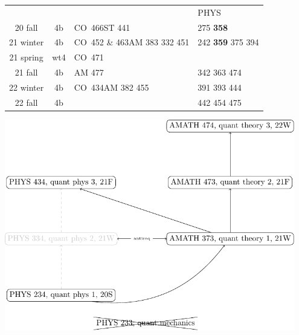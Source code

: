 \documentclass{article}
\newcommand{\co}[1]{{\color{red}CO~#1}}
\begin{document}
\pagestyle{empty}
\begin{table}[h!]
\centering
{}
\begin{adjustbox}{width=\textwidth}
\begin{tabular}{|c | c  | l | l| }
	\hline
	&     &                              & PHYS                                           \\
	20 fall  & 4b  & \co{466}\quad ST 441         & {\tiny 275}  {\bfseries 358}                   \\
	21 winter & 4b  & \co{452 \& 463}\quad  AM 383 {\tiny332 451} &  242 {\bfseries359} {\tiny 375} {\tiny 394} \\
	21 spring & wt4 & \co{471}      &   \\
	21 fall  & 4b  & AM 477 &  342 363  {\tiny 474}  \\
	22 winter & 4b  & \co{434}\quad AM 382 {\tiny 455}         & 391  393 {\tiny 444}            \\
	22 fall  & 4b  &    &  442  454  {\tiny 475} \\ \hline
\end{tabular}
\end{adjustbox}
\end{table}

\vspace{3em}


\includegraphics[width=0.95\textwidth]{../quantum/quantum}
\end{document}
